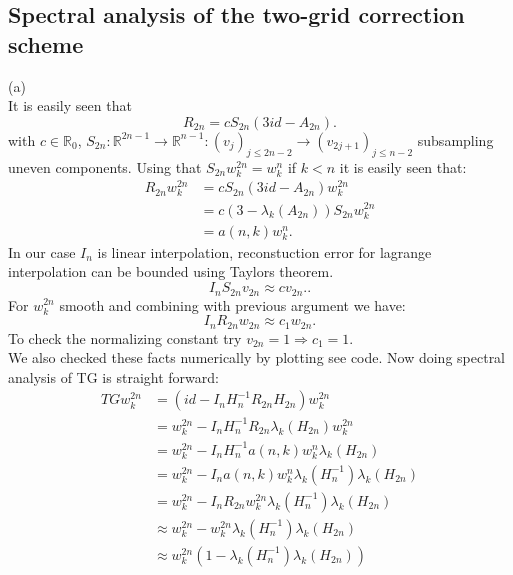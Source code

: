 \documentclass[a4paper,12pt]{article}
\begin{document}
\subsection{Spectral analysis of the two-grid correction scheme}
(a) \\
It is easily seen that
\begin{equation}
    R_{2n} =  c S_{2n} (3id -A_{2n}).
\end{equation}
with $c \in \mathbb{R}_{0}$, $S_{2n}: \mathbb{R}^{2n-1} \rightarrow \mathbb{R}^{n-1}: (v_{j})_{j \leq 2n-2}
    \rightarrow (v_{2j+1})_{j \leq n-2}$  subsampling uneven components.
Using that $S_{2n}w_{k}^{2n} = w_{k}^{n}$ if $k<n$ it is easily seen that:
\begin{align}
    R_{2n} w_{k}^{2n} & = cS_{2n}(3id- A_{2n}) w_{k}^{2n}             \\
                      & = c(3- \lambda_{k}(A_{2n})) S_{2n} w_{k}^{2n} \\
                      & = a(n,k) w_{k}^{n} .
\end{align}
In our case $I_{n}$ is linear interpolation, reconstuction error for lagrange interpolation can be bounded
using Taylors theorem.
\begin{equation}
    I_{n} S_{2n} v_{2n}  \approx c v_{2n}.
    .
\end{equation}
For $w_{k}^{2n}$ smooth and combining with previous argument we have:
\begin{equation}
    I_{n} R_{2n} w_{2n}  \approx c_{1} w_{2n}.
\end{equation}
To check the normalizing constant try $v_{2n} = 1 \Rightarrow c_{1} =1$. \\
We also checked these facts numerically by plotting see code. Now doing spectral analysis of TG is
straight forward:
\begin{align}
    TG w_{k}^{2n} & = (id - I_{n} H_{n}^{-1} R_{2n} H_{2n}) w_{k}^{2n}                                    \\
                  & =  w_{k}^{2n} - I_{n} H_{n}^{-1} R_{2n} \lambda_{k}(H_{2n}) w_{k}^{2n}                \\
                  & =  w_{k}^{2n} - I_{n} H_{n}^{-1}  a(n,k) w_{k}^{n} \lambda_{k}(H_{2n})                \\
                  & =  w_{k}^{2n} - I_{n}  a(n,k) w_{k}^{n} \lambda_{k}(H_{n}^{-1})  \lambda_{k}(H_{2n})  \\
                  & =  w_{k}^{2n} - I_{n}  R_{2n} w_{k}^{2n} \lambda_{k}(H_{n}^{-1})  \lambda_{k}(H_{2n}) \\
                  & \approx  w_{k}^{2n} -  w_{k}^{2n} \lambda_{k}(H_{n}^{-1})  \lambda_{k}(H_{2n})        \\
                  & \approx  w_{k}^{2n} (1-   \lambda_{k}(H_{n}^{-1})  \lambda_{k}(H_{2n}))
\end{align}
\end{document}
